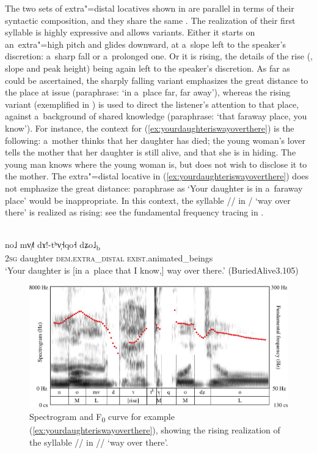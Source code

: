 The two sets of extra"=distal locatives shown in  are parallel in terms of their syntactic composition, and they share the same . The realization of their first syllable is highly expressive and allows
variants. Either it starts on an~extra"=high pitch and glides downward, at a~slope left to the
speaker’s discretion: a~sharp fall or a~prolonged one. Or it is rising, the details of the rise
(, slope and peak height) being again left to the speaker’s discretion. As far as could be
ascertained, the sharply falling variant emphasizes the great distance to the place at issue
(paraphrase: ‘in a~place far, far away’), whereas the rising variant (exemplified in ) is used to direct the listener’s
attention to that place, against a~background of shared knowledge (paraphrase: ‘that faraway
place, you know’). For instance, the context for (\ref{ex:yourdaughteriswayoverthere}) is the following: a~mother thinks that her daughter has died; the young woman's lover tells the mother that her daughter is still alive, and that she is in hiding. The young man knows where the young woman is, but does not wish to disclose it to the mother. The extra"=distal locative in (\ref{ex:yourdaughteriswayoverthere}) does not emphasize the great distance: paraphrase as ‘Your daughter is in a~faraway place’ would be inappropriate. In this context, the syllable // in / ‘way over there’ is realized as rising: see the fundamental frequency tracing in .

\begin{exe}
	\ex
	\label{ex:yourdaughteriswayoverthere}
	\\ 
	\gll no˩	mv̩˩˥		dɤ!-tʰv̩˧qo˧	dʑo˩\textsubscript{b}\\
	\textsc{2sg}	daughter	\textsc{dem.extra\_distal}		\textsc{exist}.animated\_beings\\
	\glt ‘Your daughter is [in a~place that I know,] way over there.’ {\newline}(BuriedAlive3.105)
\end{exe}

\begin{figure}[ht]
	\includegraphics[width=\textwidth]{figures/Xdistal/distal.eps}
	\caption{Spectrogram and F\textsubscript{0} curve for example (\ref{ex:yourdaughteriswayoverthere}), showing the rising realization of the syllable // in // ‘way over there’.}
	\label{fig:distalrising}
\end{figure}


